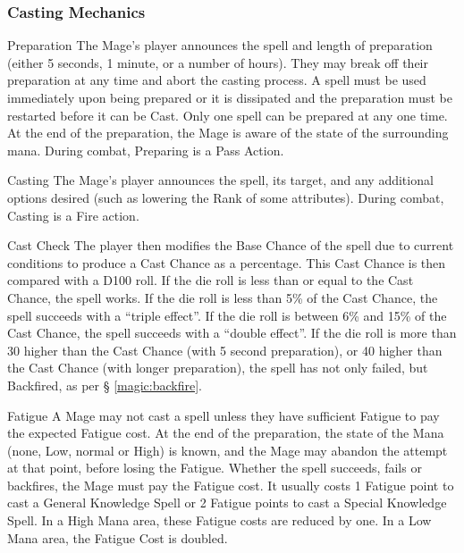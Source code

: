 \begin{multicols*}{3}
\subsubsection{Casting Mechanics}

\begin{Description}

\item[Preparation] The Mage's player announces the spell and length of
preparation (either 5 seconds, 1 minute, or a number of hours). They
may break off their preparation at any time and abort the casting
process. A spell must be used immediately upon being prepared or it is
dissipated and the preparation must be restarted before it can be
Cast. Only one spell can be prepared at any one time. At the end of
the preparation, the Mage is aware of the state of the surrounding
mana. During combat, Preparing is a Pass Action.

\item[Casting] The Mage's player announces the spell, its target, and
any additional options desired (such as lowering the Rank of some
attributes). During combat, Casting is a Fire action.

\item[Cast Check] The player then modifies the Base Chance of the
spell due to current conditions to produce a Cast Chance as a
percentage. This Cast Chance is then compared with a D100 roll. If the
die roll is less than or equal to the Cast Chance, the spell works. If
the die roll is less than 5\% of the Cast Chance, the spell succeeds
with a ``triple effect''. If the die roll is between 6\% and 15\% of
the Cast Chance, the spell succeeds with a ``double effect''. If the
die roll is more than 30 higher than the Cast Chance (with 5 second
preparation), or 40 higher than the Cast Chance (with longer
preparation), the spell has not only failed, but Backfired, as per \S
\ref{magic:backfire}.

\item[Fatigue] A Mage may not cast a spell unless they have sufficient
Fatigue to pay the expected Fatigue cost. At the end of the
preparation, the state of the Mana (none, Low, normal or High) is
known, and the Mage may abandon the attempt at that point, before
losing the Fatigue. Whether the spell succeeds, fails or backfires,
the Mage must pay the Fatigue cost. It usually costs 1 Fatigue point
to cast a General Knowledge Spell or 2 Fatigue points to cast a
Special Knowledge Spell. In a High Mana area, these Fatigue costs are
reduced by one. In a Low Mana area, the Fatigue Cost is doubled.


\end{Description}
\end{multicols*}
